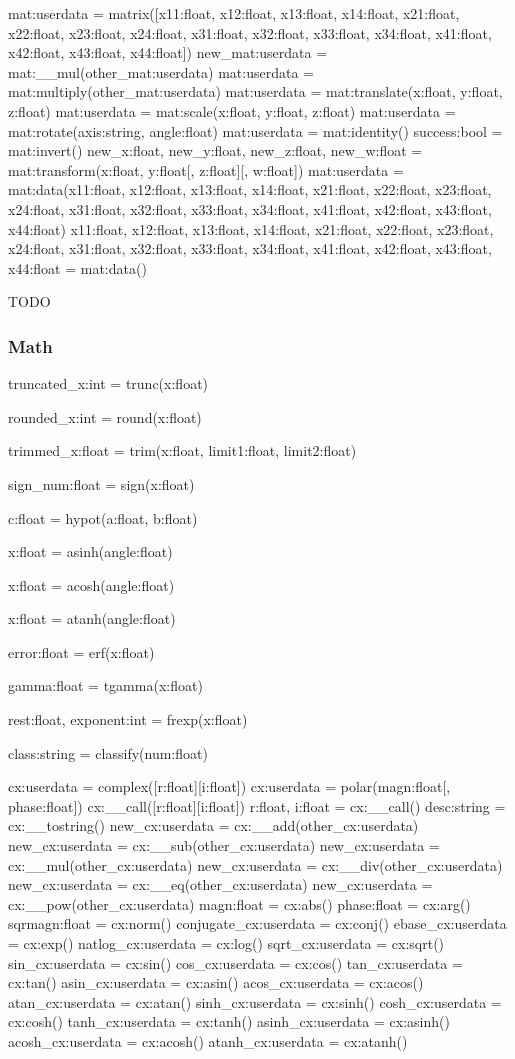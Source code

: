 mat:userdata = matrix([x11:float, x12:float, x13:float, x14:float, x21:float, x22:float, x23:float, x24:float, x31:float, x32:float, x33:float, x34:float, x41:float, x42:float, x43:float, x44:float])
new_mat:userdata = mat:__mul(other_mat:userdata)
mat:userdata = mat:multiply(other_mat:userdata)
mat:userdata = mat:translate(x:float, y:float, z:float)
mat:userdata = mat:scale(x:float, y:float, z:float)
mat:userdata = mat:rotate(axis:string, angle:float)
mat:userdata = mat:identity()
success:bool = mat:invert()
new_x:float, new_y:float, new_z:float, new_w:float = mat:transform(x:float, y:float[, z:float][, w:float])
mat:userdata = mat:data(x11:float, x12:float, x13:float, x14:float, x21:float, x22:float, x23:float, x24:float, x31:float, x32:float, x33:float, x34:float, x41:float, x42:float, x43:float, x44:float)
x11:float, x12:float, x13:float, x14:float, x21:float, x22:float, x23:float, x24:float, x31:float, x32:float, x33:float, x34:float, x41:float, x42:float, x43:float, x44:float = mat:data()

TODO

\subsubsection{Math}
\label{sec:math}

truncated_x:int = trunc(x:float)

rounded_x:int = round(x:float)

trimmed_x:float = trim(x:float, limit1:float, limit2:float)

sign_num:float = sign(x:float)

c:float = hypot(a:float, b:float)

x:float = asinh(angle:float)

x:float = acosh(angle:float)

x:float = atanh(angle:float)

error:float = erf(x:float)

gamma:float = tgamma(x:float)

rest:float, exponent:int = frexp(x:float)

class:string = classify(num:float)

cx:userdata = complex([r:float][i:float])
cx:userdata = polar(magn:float[, phase:float])
cx:__call([r:float][i:float])
r:float, i:float = cx:__call()
desc:string = cx:__tostring()
new_cx:userdata = cx:__add(other_cx:userdata)
new_cx:userdata = cx:__sub(other_cx:userdata)
new_cx:userdata = cx:__mul(other_cx:userdata)
new_cx:userdata = cx:__div(other_cx:userdata)
new_cx:userdata = cx:__eq(other_cx:userdata)
new_cx:userdata = cx:__pow(other_cx:userdata)
magn:float = cx:abs()
phase:float = cx:arg()
sqrmagn:float = cx:norm()
conjugate_cx:userdata = cx:conj()
ebase_cx:userdata = cx:exp()
natlog_cx:userdata = cx:log()
sqrt_cx:userdata = cx:sqrt()
sin_cx:userdata = cx:sin()
cos_cx:userdata = cx:cos()
tan_cx:userdata = cx:tan()
asin_cx:userdata = cx:asin()
acos_cx:userdata = cx:acos()
atan_cx:userdata = cx:atan()
sinh_cx:userdata = cx:sinh()
cosh_cx:userdata = cx:cosh()
tanh_cx:userdata = cx:tanh()
asinh_cx:userdata = cx:asinh()
acosh_cx:userdata = cx:acosh()
atanh_cx:userdata = cx:atanh()


